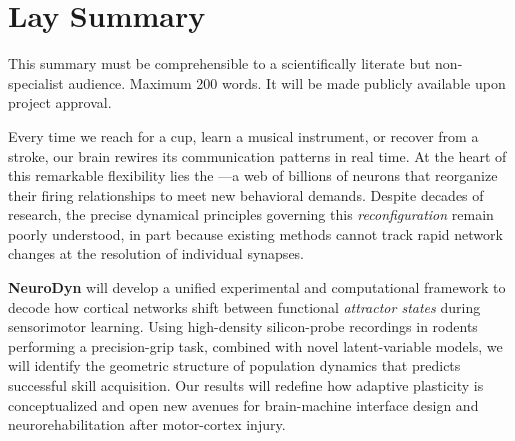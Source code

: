 \section{Lay Summary}

\begin{tcolorbox}[snsfinfo]
  {\small\color{SNSFgray}\faInfoCircle\quad
  This summary must be comprehensible to a scientifically literate but non-specialist audience.
  Maximum 200 words. It will be made publicly available upon project approval.}
\end{tcolorbox}
\vspace{4pt}

Every time we reach for a cup, learn a musical instrument, or recover from a stroke, our brain
rewires its communication patterns in real time. At the heart of this remarkable flexibility lies
the ---a web of billions of neurons that reorganize their firing
relationships to meet new behavioral demands. Despite decades of research, the precise dynamical
principles governing this \textit{reconfiguration} remain poorly understood, in part because
existing methods cannot track rapid network changes at the resolution of individual synapses.

\textbf{NeuroDyn} will develop a unified experimental and computational framework to decode how
cortical networks shift between functional \textit{attractor states} during sensorimotor learning.
Using high-density silicon-probe recordings in rodents performing a precision-grip task, combined
with novel latent-variable models, we will identify the geometric structure of population dynamics
that predicts successful skill acquisition. Our results will redefine how adaptive plasticity is
conceptualized and open new avenues for brain-machine interface design and neurorehabilitation
after motor-cortex injury.

\vspace{6pt}

